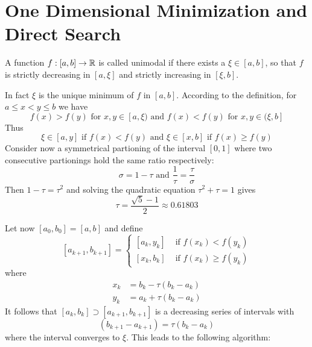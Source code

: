 
\newpage
\section{One Dimensional Minimization and Direct Search}


\begin{definition}\label{def:unimodal_fnc}
A function \( f : [a,b] \to \mathbb{R} \) is called unimodal if there exists a \( \xi \in [a,b] \), so that
\( f \) is strictly decreasing in \( [a, \xi] \) and strictly increasing in \( [\xi, b] \).
\end{definition}
\bigskip

In fact \( \xi \) is the unique minimum of \( f \) in \( [a, b] \). According to the definition, 
for \( a \le x < y \le b \) we have 
\[
    f(x) > f(y) \text{ for } x, y \in [a, \xi) \text{ and } f(x) < f(y) \text{ for }  x, y \in (\xi, b]
\]
Thus
\[
    \xi \in [a, y] \text{ if } f(x) < f(y) \text{ and } \xi \in [x, b] \text{ if } f(x) \ge f(y)
\]
Consider now a symmetrical partioning of the interval \( [0, 1] \) where two consecutive partionings hold 
the same ratio respectively:
\[
     \sigma = 1 - \tau \text{ and } \frac{1}{\tau} = \frac{\tau}{\sigma}
\]
Then \( 1 - \tau = \tau^2 \) and solving the quadratic equation \( \tau^2 + \tau = 1 \) gives
\[ 
     \tau = \frac{\sqrt{5} - 1}{2} \approx 0.61803
\]
\bigskip

\begin{center}
\end{center}
\bigskip

Let now \( [a_0, b_0] = [a, b] \) and define 
\[  
    [a_{k + 1}, b_{k + 1}] = 
        \begin{cases}
            [a_k, y_k] & \text{ if } f(x_k) < f(y_k)  \\
            [x_k, b_k] & \text{ if } f(x_k) \ge f(y_k)
        \end{cases}
\]
where
\[
    \begin{split}
        x_k & = b_k - \tau (b_k - a_k) \\ 
        y_k & = a_k + \tau (b_k - a_k)
    \end{split}
\]
It follows that \( [a_k, b_k] \supset [a_{k + 1}, b_{k + 1}] \) is a decreasing series of intervals with
\[  
    (b_{k + 1} - a_{k + 1}) =  \tau(b_k - a_k)
\]
where the interval converges to \( \xi \). This leads to the following algorithm:
\bigskip

